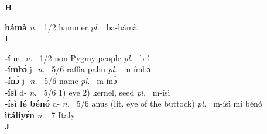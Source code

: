 \medskip
\noindent \large {\bfseries H}\normalsize\\
\medskip
\noindent

{\bfseries hámà}  {\itshape n.~} 1/2 hammer {\itshape pl.~} ba-hámà    \\ 

\medskip
\noindent \large {\bfseries I}\normalsize\\
\medskip

\noindent
{\bfseries -í} m- {\itshape n.~} 1/2 non-Pygmy people {\itshape pl.~} b-í    \\ 
{\bfseries -ímbɔ́} j- {\itshape n.~} 5/6 raffia palm {\itshape pl.~} m-ímbɔ́    \\ 
{\bfseries -ínɔ̀} j- {\itshape n.~} 5/6 name {\itshape pl.~} m-ínɔ̀    \\ 
{\bfseries -ísì} d- {\itshape n.~} 5/6 1) eye 2) kernel, seed {\itshape pl.~} m-ísì    \\ 
{\bfseries -ísì lé bénó} d- {\itshape n.~} 5/6 anus (lit. eye of the buttock) {\itshape pl.~} m-ísì mí bénó \\ 
{\bfseries ìtálíyɛ̀n} {\itshape n.~} 7 Italy    \\ 

\medskip
\noindent \large {\bfseries J}\normalsize\\
\medskip

